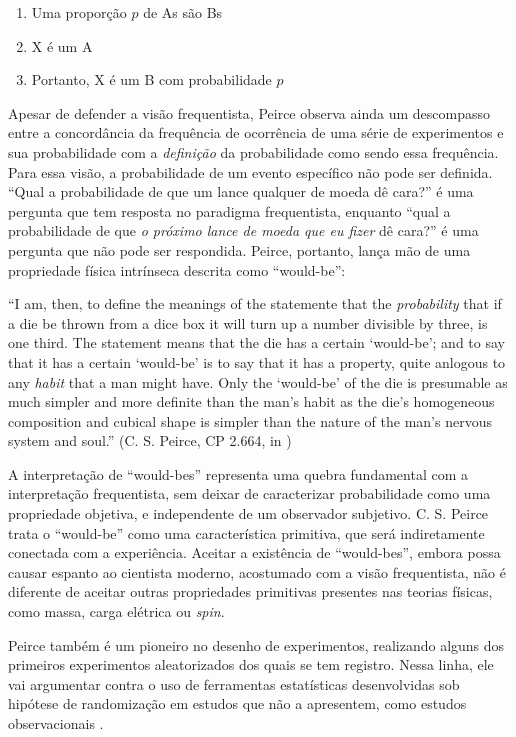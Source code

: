 \begin{enumerate}
	\item Uma proporção $p$ de As são Bs
	\item X é um A
	\item Portanto, X é um B com probabilidade $p$ 
\end{enumerate}

Apesar de defender a visão frequentista, Peirce observa ainda um descompasso entre a concordância da frequência de ocorrência
de uma série de experimentos e sua probabilidade com a {\em definição} da probabilidade como sendo essa frequência. Para
essa visão, a probabilidade de um evento específico não pode ser definida. ``Qual a probabilidade de que um lance qualquer
de moeda dê cara?'' é uma pergunta que tem resposta no paradigma frequentista, enquanto ``qual a probabilidade de que 
{\em o próximo lance de moeda que eu fizer} dê cara?'' é uma pergunta que não pode ser respondida. Peirce, portanto, lança
mão de uma propriedade física intrínseca descrita como ``would-be'':

``I am, then, to define the meanings of the statemente that the {\em probability} that if a die be thrown from a dice
box it will turn up a number divisible by three, is one third. The statement means that the die has a certain `would-be';
and to say that it has a certain `would-be' is to say that it has a property, quite anlogous to any {\em habit} that a man
might have. Only the `would-be' of the die is presumable as much simpler and more definite than the man's habit as the
die's homogeneous composition and cubical shape is simpler than the nature of the man's nervous system and soul.''
(C. S. Peirce, CP 2.664, in \citep{Fetzer93})

A interpretação de ``would-bes'' representa uma quebra fundamental com a interpretação frequentista, sem deixar de caracterizar
probabilidade como uma propriedade objetiva, e independente de um observador subjetivo. C. S. Peirce trata o ``would-be'' como
uma característica primitiva, que será indiretamente conectada com a experiência. Aceitar a existência de ``would-bes'', 
embora possa causar espanto ao cientista moderno, acostumado com a visão 
frequentista, não é diferente de aceitar outras propriedades
primitivas presentes nas teorias físicas, como massa, carga elétrica ou {\em spin}.

Peirce também é um pioneiro no desenho de experimentos, realizando alguns dos primeiros experimentos aleatorizados
dos quais se tem registro. Nessa linha, ele vai argumentar contra o uso de ferramentas estatísticas desenvolvidas sob
hipótese de randomização em estudos que não a apresentem, como estudos observacionais \citep{Stigler78}.

